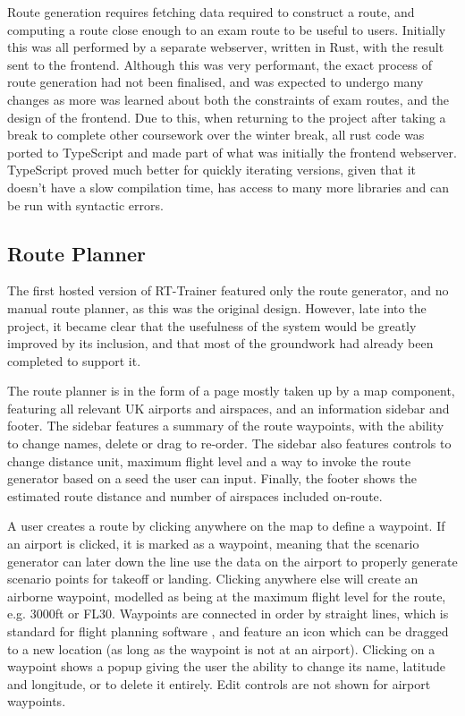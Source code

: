 Route generation requires fetching data required to construct a route, and computing a route close enough to an exam route to be useful to users. Initially this was all performed by a separate webserver, written in Rust, with the result sent to the frontend. Although this was very performant, the exact process of route generation had not been finalised, and was expected to undergo many changes as more was learned about both the constraints of exam routes, and the design of the frontend. Due to this, when returning to the project after taking a break to complete other coursework over the winter break, all rust code was ported to TypeScript and made part of what was initially the frontend webserver. TypeScript proved much better for quickly iterating versions, given that it doesn't have a slow compilation time, has access to many more libraries and can be run with syntactic errors. 


\subsection{Route Planner}
\label{sse:routeplanner}

The first hosted version of RT-Trainer featured only the route generator, and no manual route planner, as this was the original design. However, late into the project, it became clear that the usefulness of the system would be greatly improved by its inclusion, and that most of the groundwork had already been completed to support it. 

The route planner is in the form of a page mostly taken up by a map component, featuring all relevant UK airports and airspaces, and an information sidebar and footer. The sidebar features a summary of the route waypoints, with the ability to change names, delete or drag to re-order. The sidebar also features controls to change distance unit, maximum flight level and a way to invoke the route generator based on a seed the user can input. Finally, the footer shows the estimated route distance and number of airspaces included on-route.

A user creates a route by clicking anywhere on the map to define a waypoint. If an airport is clicked, it is marked as a waypoint, meaning that the scenario generator can later down the line use the data on the airport to properly generate scenario points for takeoff or landing. Clicking anywhere else will create an airborne waypoint, modelled as being at the maximum flight level for the route, e.g. 3000ft or FL30. Waypoints are connected in order by straight lines, which is standard for flight planning software \cite{SkyDemon}\cite{SkyVector}, and feature an icon which can be dragged to a new location (as long as the waypoint is not at an airport). Clicking on a waypoint shows a popup giving the user the ability to change its name, latitude and longitude, or to delete it entirely. Edit controls are not shown for airport waypoints.

